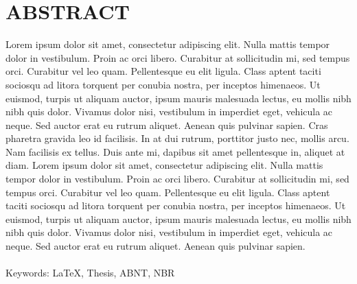 \chapter*{ABSTRACT}

Lorem ipsum dolor sit amet, consectetur adipiscing elit. Nulla mattis tempor dolor in vestibulum. Proin ac orci libero. Curabitur at sollicitudin mi, sed tempus orci. Curabitur vel leo quam. Pellentesque eu elit ligula. Class aptent taciti sociosqu ad litora torquent per conubia nostra, per inceptos himenaeos. Ut euismod, turpis ut aliquam auctor, ipsum mauris malesuada lectus, eu mollis nibh nibh quis dolor. Vivamus dolor nisi, vestibulum in imperdiet eget, vehicula ac neque. Sed auctor erat eu rutrum aliquet. Aenean quis pulvinar sapien. Cras pharetra gravida leo id facilisis. In at dui rutrum, porttitor justo nec, mollis arcu. Nam facilisis ex tellus. Duis ante mi, dapibus sit amet pellentesque in, aliquet at diam. Lorem ipsum dolor sit amet, consectetur adipiscing elit. Nulla mattis tempor dolor in vestibulum. Proin ac orci libero. Curabitur at sollicitudin mi, sed tempus orci. Curabitur vel leo quam. Pellentesque eu elit ligula. Class aptent taciti sociosqu ad litora torquent per conubia nostra, per inceptos himenaeos. Ut euismod, turpis ut aliquam auctor, ipsum mauris malesuada lectus, eu mollis nibh nibh quis dolor. Vivamus dolor nisi, vestibulum in imperdiet eget, vehicula ac neque. Sed auctor erat eu rutrum aliquet. Aenean quis pulvinar sapien.
\\
\\
Keywords: LaTeX, Thesis, ABNT, NBR